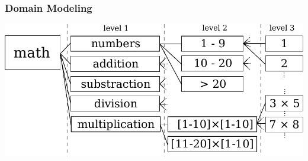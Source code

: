 \documentclass[xcolor=svgnames]{beamer}
\begin{document}
\begin{frame}
    \frametitle{Domain Modeling}
    \centering
    \includegraphics[width=0.9\linewidth]{figures/domain-models}

    \vfill
    \huge

\end{frame}
\end{document}
